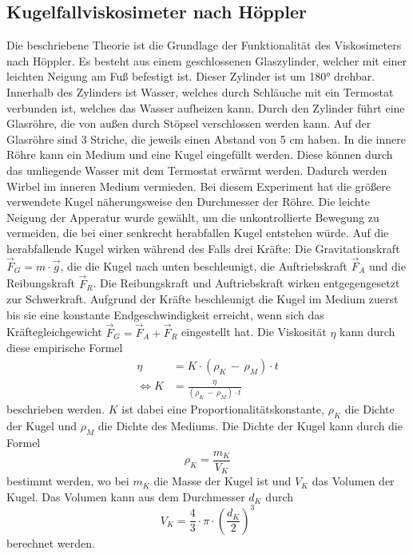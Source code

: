         \subsection{Kugelfallviskosimeter nach Höppler}
            Die beschriebene Theorie ist die Grundlage der Funktionalität des Viskosimeters 
            nach Höppler. Es besteht aus einem geschlossenen Glaszylinder, 
            welcher mit einer leichten Neigung am Fuß befestigt
            ist. Dieser Zylinder ist um 180° drehbar. 
            Innerhalb des Zylinders ist Wasser, welches durch Schläuche mit ein Termostat verbunden ist,
            welches das Wasser aufheizen 
            kann.
            Durch den Zylinder führt eine Glasröhre, die von außen durch Stöpsel 
            verschlossen werden kann. Auf der Glasröhre sind 3 Striche, die jeweils 
            einen Abstand von 5 \unit{\centi\meter} haben. In die innere Röhre kann
            ein Medium und eine Kugel eingefüllt werden. Diese können durch das umliegende Wasser mit dem 
            Termostat erwärmt werden. Dadurch werden Wirbel im inneren Medium vermieden. 
            Bei diesem Experiment hat die größere verwendete Kugel näherungsweise den Durchmesser der Röhre. 
            Die leichte Neigung der Apperatur wurde gewählt, um die unkontrollierte Bewegung zu vermeiden, 
            die bei einer senkrecht herabfallen Kugel entstehen würde. Auf die herabfallende Kugel
            wirken während des Falls drei Kräfte: Die Gravitationskraft $\vec{F}_{G} = m \cdot \vec{g}$, 
            die die Kugel nach unten beschleunigt, die Auftriebskraft $\vec{F}_{A}$ und die 
            Reibungskraft $\vec{F}_{R}$. Die Reibungskraft und Auftriebskraft wirken entgegengesetzt zur Schwerkraft. 
            Aufgrund der Kräfte beschleunigt
            die Kugel im Medium zuerst bis sie eine konstante Endgeschwindigkeit erreicht, wenn sich das Kräftegleichgewicht 
            $\vec{F}_{G} = \vec{F}_{A} + \vec{F}_{R}$ eingestellt hat.
            Die Viskosität $\eta$ kann durch diese empirische Formel  
            \begin{align}
                \eta &= K \cdot \left( \rho_{K}\,-\,\rho_{M} \right) \cdot t \label{equ:EmpirischeEtaFunktion} \\
                \Leftrightarrow K &= \frac{\eta}{ \left( \rho_{K}\,-\,\rho_{M} \right) \cdot t }
                \label{eqn:KFunktion}
            \end{align} 
            beschrieben werden. $K$ ist dabei eine Proportionalitätskonstante, $\rho_{K}$ die Dichte der Kugel und $\rho_{M}$
            die Dichte des Mediums. Die Dichte der Kugel kann durch die Formel 
            \begin{equation}
                \rho_{K} = \frac{m_{K}}{V_{K}}
                \label{eqn:DichtefunktionKugel}
            \end{equation}
            bestimmt werden, wo bei $m_{K}$ die Masse der Kugel ist und $V_{K}$ das Volumen der Kugel.
            Das Volumen kann aus dem Durchmesser $d_{K}$ durch
            \begin{equation}
                V_{K} = \frac{4}{3} \cdot \pi \cdot \left( \frac{d_{K}}{2} \right)^3
                \label{eqn:VolumenKugel}
            \end{equation} 
            berechnet werden. 
